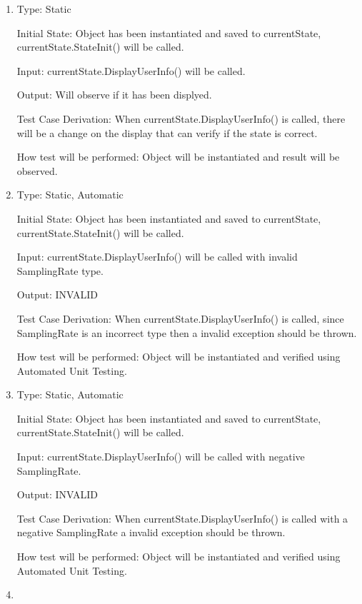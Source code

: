 \documentclass[12pt, titlepage]{article}
\begin{document}
\begin{enumerate}[{UT-CS}1.]

\item

Type: Static
          
Initial State: Object has been instantiated and saved to currentState, currentState.StateInit() will be called.
          
Input: currentState.DisplayUserInfo() will be called.
          
Output: Will observe if it has been displyed.

Test Case Derivation: When currentState.DisplayUserInfo() is called, there will be a change on the display that can verify if the state is correct.


How test will be performed: Object will be instantiated and result will be observed.

\item

Type: Static, Automatic
					
Initial State: Object has been instantiated and saved to currentState, currentState.StateInit() will be called.
					
Input: currentState.DisplayUserInfo() will be called with invalid SamplingRate type.
					
Output: INVALID

Test Case Derivation: When currentState.DisplayUserInfo() is called, since SamplingRate is an incorrect type then a invalid exception should be thrown.

How test will be performed: Object will be instantiated and verified using Automated Unit Testing.
					
\item

Type: Static, Automatic
					
Initial State: Object has been instantiated and saved to currentState, currentState.StateInit() will be called.
					
Input: currentState.DisplayUserInfo() will be called with negative SamplingRate.
					
Output: INVALID

Test Case Derivation: When currentState.DisplayUserInfo() is called with a negative SamplingRate a invalid exception should be thrown.

How test will be performed: Object will be instantiated and verified using Automated Unit Testing.

\item


\end{enumerate}
\end{document}
